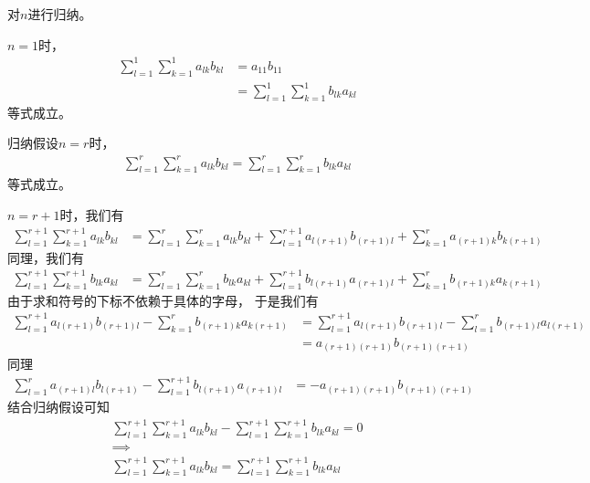 \documentclass{article}
\begin{document}
\begin{itemize}
        对$n$进行归纳。

        $n = 1$时，
        \begin{align*}
          \sum \limits_{l = 1}^1 \sum\limits_{k = 1}^1 a_{lk}b_{kl}
           & = a_{11}b_{11}                                              \\
           & = \sum \limits_{l = 1}^1 \sum\limits_{k = 1}^1 b_{lk}a_{kl}
        \end{align*}
        等式成立。

        归纳假设$n = r$时，
        \begin{align*}
          \sum \limits_{l = 1}^r \sum\limits_{k = 1}^r a_{lk}b_{kl} = \sum \limits_{l = 1}^r \sum\limits_{k = 1}^r b_{lk}a_{kl}
        \end{align*}
        等式成立。

        $n = r + 1$时，我们有
        \begin{align*}
          \sum \limits_{l = 1}^{r + 1} \sum\limits_{k = 1}^{r + 1} a_{lk}b_{kl}
          & = \sum \limits_{l = 1}^r \sum\limits_{k = 1}^r a_{lk}b_{kl} 
          + \sum \limits_{l = 1}^{r + 1} a_{l(r + 1)}b_{(r+1)l}
          + \sum \limits_{k = 1}^{r} a_{(r + 1)k} b_{k(r + 1)}
        \end{align*}
        同理，我们有
        \begin{align*}
          \sum \limits_{l = 1}^{r + 1} \sum\limits_{k = 1}^{r + 1} b_{lk}a_{kl}
          & = \sum \limits_{l = 1}^r \sum\limits_{k = 1}^r b_{lk}a_{kl} 
          + \sum \limits_{l = 1}^{r + 1} b_{l(r + 1)}a_{(r+1)l}
          + \sum \limits_{k = 1}^{r} b_{(r + 1)k} a_{k(r + 1)}
        \end{align*}
        由于求和符号的下标不依赖于具体的字母，
        于是我们有
        \begin{align*}
          \sum \limits_{l = 1}^{r + 1} a_{l(r + 1)}b_{(r+1)l} - \sum \limits_{k = 1}^{r} b_{(r + 1)k} a_{k(r + 1)}
          & = \sum \limits_{l = 1}^{r + 1} a_{l(r + 1)}b_{(r+1)l} - \sum \limits_{l = 1}^{r} b_{(r + 1)l} a_{l(r + 1)} \\
          & = a_{(r + 1)(r + 1)}b_{(r + 1)(r + 1)}
        \end{align*}
        同理
        \begin{align*}
          \sum \limits_{l = 1}^{r} a_{(r + 1)l} b_{l(r + 1)} - \sum \limits_{l = 1}^{r + 1} b_{l(r + 1)}a_{(r+1)l}
          & = - a_{(r + 1)(r + 1)}b_{(r + 1)(r + 1)}
        \end{align*}
        结合归纳假设可知
        \begin{align*}
          \sum \limits_{l = 1}^{r + 1} \sum\limits_{k = 1}^{r + 1} a_{lk}b_{kl} 
          -  \sum \limits_{l = 1}^{r + 1} \sum\limits_{k = 1}^{r + 1} b_{lk}a_{kl} = 0 \\
          \implies \\
          \sum \limits_{l = 1}^{r + 1} \sum\limits_{k = 1}^{r + 1} a_{lk}b_{kl} 
          =  \sum \limits_{l = 1}^{r + 1} \sum\limits_{k = 1}^{r + 1} b_{lk}a_{kl}
        \end{align*}


\end{itemize}
\end{document}
